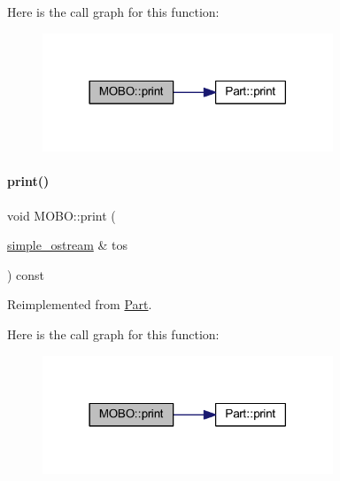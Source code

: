 Here is the call graph for this function\+:
\nopagebreak
\begin{figure}[H]
\begin{center}
\leavevmode
\includegraphics[width=246pt]{class_m_o_b_o_a4c78cec3a2a3e4d4480855622f50bd06_cgraph}
\end{center}
\end{figure}
\mbox{\label{class_m_o_b_o_a01fed4470cbf8c58f86426aa8f52b225}} 
\paragraph{\texorpdfstring{print()}{print()}\hspace{0.1cm}{\footnotesize\ttfamily [3/4]}}
{\footnotesize\ttfamily void M\+O\+B\+O\+::print (\begin{DoxyParamCaption}\item[{\mbox{\hyperlink{structsimple__ostream}{simple\+\_\+ostream}} \&}]{tos }\end{DoxyParamCaption}) const\hspace{0.3cm}{\ttfamily [virtual]}}



Reimplemented from \mbox{\hyperlink{class_part_aa602d876151b63db72cf8f666847a8cd}{Part}}.

Here is the call graph for this function\+:
\nopagebreak
\begin{figure}[H]
\begin{center}
\leavevmode
\includegraphics[width=246pt]{class_m_o_b_o_a01fed4470cbf8c58f86426aa8f52b225_cgraph}
\end{center}
\end{figure}
\mbox{\label{class_m_o_b_o_a3dd7e36103afbb4b6c09b65975317b9c}} 
